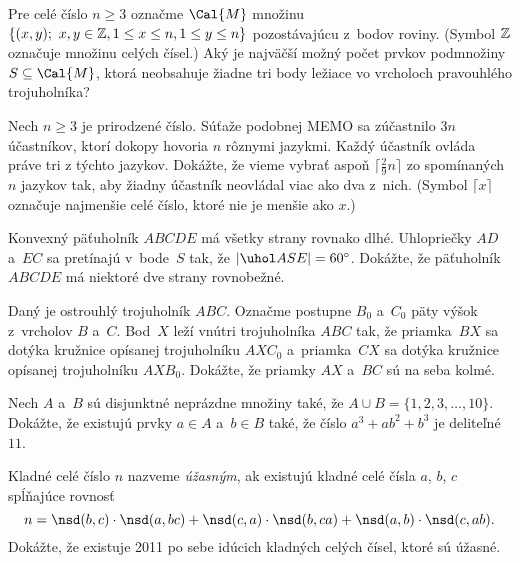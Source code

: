 {%
Pre celé číslo $n\ge3$ označme $\Cal{M}$ množinu $\{(x,y);\ x,y\in\Bbb Z, 1\le x\le n, 1\le y\le n\}$ pozostávajúcu z~bodov roviny. (Symbol $\Bbb Z$ označuje množinu celých čísel.) Aký je najväčší možný počet prvkov podmnožiny $S\subseteq \Cal{M}$, ktorá neobsahuje žiadne tri body ležiace vo vrcholoch pravouhlého trojuholníka?}

{%
Nech $n\ge 3$ je prirodzené číslo.
Súťaže podobnej MEMO sa zúčastnilo $3n$ účastníkov, ktorí dokopy hovoria $n$ rôznymi jazykmi. Každý účastník ovláda práve tri z týchto jazykov.
Dokážte, že vieme vybrať aspoň $\lceil\frac29n\rceil$ zo spomínaných $n$ jazykov tak, aby žiadny účastník neovládal viac ako dva z~nich.
(Symbol $\lceil x\rceil$ označuje najmenšie celé číslo, ktoré nie je menšie ako $x$.)
}

{%
Konvexný päťuholník $ABCDE$ má všetky strany rovnako dlhé. Uhlopriečky $AD$ a~$EC$ sa pretínajú v~bode~$S$ tak, že $|\uhol ASE| = 60^\circ$.
Dokážte, že päťuholník $ABCDE$ má niektoré dve strany rovnobežné.}

{%
Daný je ostrouhlý trojuholník $ABC$. Označme postupne $B_0$ a~$C_0$ päty výšok z~vrcholov $B$ a~$C$.
Bod~$X$ leží vnútri trojuholníka $ABC$ tak, že priamka~$BX$ sa dotýka kružnice opísanej trojuholníku $AXC_0$
a~priamka~$CX$ sa dotýka kružnice opísanej trojuholníku $AXB_0$. Dokážte, že priamky $AX$ a~$BC$ sú na seba kolmé.}

{%
Nech $A$ a~$B$ sú disjunktné neprázdne množiny také, že $A\cup B = \{1,2,3,\dots,10\}$.
Dokážte, že existujú prvky $a\in A$ a~$b\in B$ také, že číslo $a^3+ab^2+b^3$ je deliteľné $11$.}

{%
Kladné celé číslo $n$ nazveme {\it úžasným}, ak existujú kladné celé čísla $a$, $b$, $c$ spĺňajúce rovnosť
$$
n=\nsd(b,c)\cdot\nsd(a,bc)+\nsd(c,a)\cdot\nsd(b,ca)+\nsd(a,b)\cdot\nsd(c,ab).
$$
Dokážte, že existuje 2011 po sebe idúcich kladných celých čísel, ktoré sú úžasné.
}
